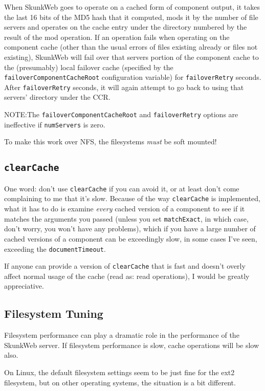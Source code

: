 \documentclass[titlepage]{manual}
\begin{document}
When SkunkWeb goes to operate on a cached form of component output, it
takes the last 16 bits of the MD5 hash that it computed, mods it by
the number of file servers and operates on the cache entry under the
directory numbered by the result of the mod operation. If an operation
fails when operating on the component cache (other than the usual
errors of files existing already or files not existing), SkunkWeb will
fail over that servers portion of the component cache to the
(presumably) local failover cache (specified by the
\texttt{failoverComponentCacheRoot} configuration variable) for
\texttt{failoverRetry} seconds. After \texttt{failoverRetry} seconds,
it will again attempt to go back to using that servers' directory
under the CCR.
   
   NOTE:The \texttt{failoverComponentCacheRoot} and
   \texttt{failoverRetry} options are ineffective if
   \texttt{numServers} is zero.

To make this work over NFS, the filesystems \emph{must} be soft mounted!

\subsection{\texttt{clearCache}}
\label{clearCache}
One word: don't use \texttt{clearCache} if you can avoid it, or at
least don't come complaining to me that it's slow.  Because of the way
\texttt{clearCache} is implemented, what it has to do is examine
\emph{every} cached version of a component to see if it matches the
arguments you passed (unless you set \texttt{matchExact}, in which
case, don't worry, you won't have any problems), which if you have a
large number of cached versions of a component can be exceedingly
slow, in some cases I've seen, exceeding the \texttt{documentTimeout}.

If anyone can provide a version of \texttt{clearCache} that is fast
and doesn't overly affect normal usage of the cache (read as: read
operations), I would be greatly appreciative.

\subsection{Filesystem Tuning}
Filesystem performance can play a dramatic role in the performance of
the SkunkWeb server.  If filesystem performance is slow, cache operations
will be slow also.

On Linux, the default filesystem settings seem to be just fine for the
ext2 filesystem, but on other operating systems, the situation is a
bit different.
\end{document}
